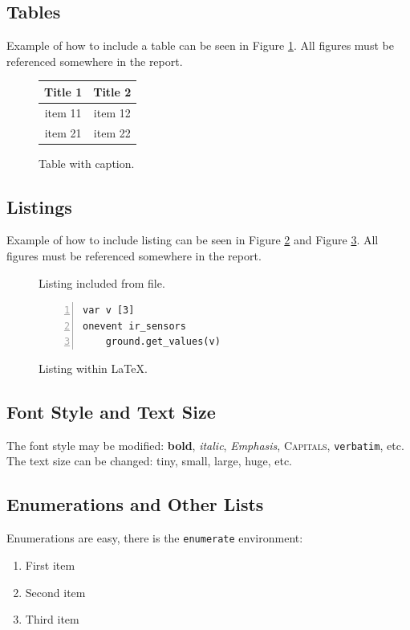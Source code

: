 \documentclass[12pt,a4paper]{article}
\begin{document}
\subsection{Tables}
Example of how to include a table can be seen in Figure \ref{fig:someTable}. All figures must be referenced somewhere in the report.
\begin{figure}[h]
\begin{center}
\begin{tabular}{|c|c|}
\hline
\textbf{Title 1} & \textbf{Title 2} \\
\hline
item 11	&	item 12	\\
\hline
item 21	&	item 22	\\
\hline
\end{tabular}
\end{center}
\caption{Table with caption.}
\label{fig:someTable}
\end{figure}

\subsection{Listings}
Example of how to include listing can be seen in Figure \ref{fig:listing1} and Figure \ref{fig:listing2}. All figures must be referenced somewhere in the report.
\begin{figure}

\caption{Listing included from file.}
\label{fig:listing1}
\end{figure}
\begin{figure}
\begin{lstlisting}[basicstyle=\ttfamily, frame=single, tabsize=4, numbers=left]
var v [3]
onevent ir_sensors
	ground.get_values(v)
\end{lstlisting}
\caption{Listing within \LaTeX{}.}
\label{fig:listing2}
\end{figure}

\subsection{Font Style and Text Size}
The font style may be modified: \textbf{bold}, \textit{italic}, \emph{Emphasis}, \textsc{Capitals}, \verb|verbatim|, etc.\\
The text size can be changed: \tiny tiny, \small small, \large large, \huge huge, \normalsize etc.

\subsection{Enumerations and Other Lists}
Enumerations are easy, there is the
\texttt{enumerate} environment:
%
\begin{enumerate}
  \item First item
  \item Second item
  \item Third item
\end{enumerate}
\end{document}
